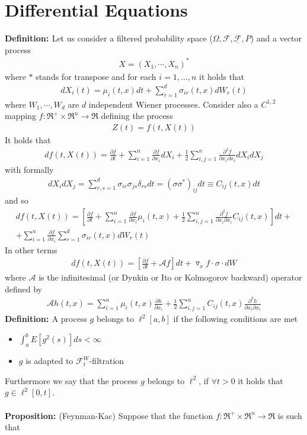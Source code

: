 \documentclass[a4paper,10pt]{report}
\theoremstyle{plain}
\theoremstyle{definition}
\newcommand\be{\begin{eqnarray}}    %
\newcommand\ee{\end{eqnarray}}
\newcommand{\DEF} {{\bf{Definition: }}}
\newcommand{\PROP} {{\bf{Proposition: }}}
\newcommand{\AAA} {\mathcal{A} }
\newcommand{\FF} {\mathcal{F} }
\newcommand{\FLT} {\underline{\mathcal{F}}}
\begin{document}


\section{Differential Equations \label{de}}

\DEF Let us consider a filtered probability space ($\Omega, \FF, \FLT, P$) and a vector process
\be 
X=(X_1,\cdots,X_n)^*
\ee
where $*$ stands for transpose and for each $i=1,\dots, n$ it holds that
\be 
d X_i(t)=\mu_i(t, x) dt +\sum_{r=1}^d \sigma_{ir}(t, x) dW_r(t)
\ee
where $W_1,\cdots,W_d$ are $d$ independent Wiener processes.
Consider also a $C^{1,2}$ mapping $f: \Re^+ \times \Re^n\rightarrow \Re$ defining the process
\be
Z(t) = f(t, X(t)) 
\ee
It holds that
\be
df(t,X(t))=\frac{\partial f}{\partial t}+\sum_{i=1}^n \frac{\partial f}{\partial x_i} dX_i+\frac{1}{2}\sum_{i,j=1}^n \frac{\partial^2 f}{\partial x_i\partial x_i} dX_i dX_j
\ee
with formally 
\be 
dX_i dX_j = \sum_{r,s=1}^d \sigma_{ir}\sigma_{js} \delta_{rs} dt=(\sigma \sigma^*)_{ij} dt\equiv C_{ij}(t, x) dt
\ee
and so
\be
df(t,X(t))=\left[\frac{\partial f}{\partial t}+\sum_{i=1}^n \frac{\partial f}{\partial x_i} \mu_i(t, x) +\frac{1}{2}\sum_{i,j=1}^n \frac{\partial^2 f}{\partial x_i\partial x_i} C_{ij}(t, x) \right] dt + \\
+ \sum_{i=1}^n \frac{\partial f}{\partial x_i} \sum_{r=1}^d \sigma_{ir}(t,x) dW_r(t)
\label{ito}
\ee
In other terms
\be
df(t,X(t))=\left[\frac{\partial f}{\partial t}+\AAA f \right] dt + \triangledown_x f \cdot \sigma \cdot dW 
\ee
where $\AAA$ is the infinitesimal (or Dynkin or Ito or Kolmogorov backward) operator defined by
\be 
\AAA h(t,x)=\sum_{i=1}^n \mu_i(t, x) \frac{\partial h}{\partial x_i}  +\frac{1}{2}\sum_{i,j=1}^n C_{ij}(t, x) \frac{\partial^2 h}{\partial x_i\partial x_i}  
\ee
\DEF A process $g$ belongs to $\ell^2[a,b]$ if the following conditions are met
\begin{itemize}
\item $\int_a^b E[g^2(s)] ds < \infty$
\item $g$ is adapted to $\FF_t^W$-filtration
\end{itemize} 
Furthermore we say that the process $g$ belongs to $\ell^2$, if $\forall t>0$ it holds that $g\in \ell^2[0,t]$. \\ \\
\PROP (Feynman-Kac) Suppose that the function $f: \Re^+ \times \Re^n\rightarrow \Re$ is such that
\end{document}

